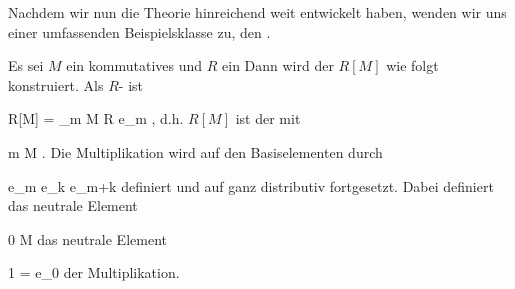 \setcounter{section}{17}


Nachdem wir nun die Theorie hinreichend weit entwickelt haben, wenden wir uns einer umfassenden Beispielsklasse zu, den  {.}







{}
{





Es sei $M$ ein kommutatives
 {} {}
und $R$ ein
Dann wird der  $R[M]$ wie folgt konstruiert. Als
$R$-
ist

\mavergleichskettedisp
{\vergleichskette
{ R[M]
}
{ =} {\bigoplus_{m \in M} R e_m
}
{ } {
}
{ } {
}
{ } {
}
}
{}{}{,}
d.h. $R [M]$ ist der
mit

 {}
 {m \in M} {}
 {} {} {} {.}
Die Multiplikation wird auf den Basiselementen durch

\mavergleichskettedisp
{\vergleichskette
{ e_m \cdot e_k
}
{ } {e_{m+k}
}
{ } {
}
{ } {
}
{ } {
}
}
{}{}{}
definiert und auf ganz
 distributiv fortgesetzt. Dabei definiert das neutrale Element

\mavergleichskette
{\vergleichskette
{ 0
}
{ \in }{ M
}
{  }{
}
{    }{
}
{   }{
}
}
{}{}{}
das neutrale Element

\mavergleichskette
{\vergleichskette
{ 1
}
{ = }{ e_0
}
{  }{
}
{    }{
}
{   }{
}
}
{}{}{}
der Multiplikation.





}

